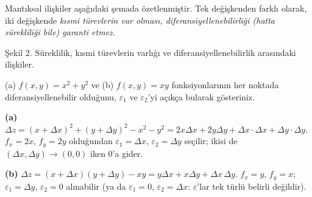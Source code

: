 Mantıksal ilişkiler aşağıdaki şemada özetlenmiştir. Tek değişkenden farklı olarak, iki değişkende \emph{kısmi türevlerin
var olması, diferansiyellenebilirliği (hatta sürekliliği bile) garanti etmez.}

\begin{center}
\end{center}
\begin{center}
{\small Şekil 2. Süreklilik, kısmi türevlerin varlığı ve diferansiyellenebilirlik arasındaki ilişkiler.}
\end{center}

\begin{soru}
(a) $f(x,y)=x^2+y^2$ ve (b) $f(x,y)=xy$ fonksiyonlarının her noktada diferansiyellenebilir olduğunu, $\varepsilon_1$
ve $\varepsilon_2$'yi açıkça bularak gösteriniz.
\end{soru}
\begin{cevap}
\textbf{(a)} $\Delta z=(x+\Delta x)^2+(y+\Delta y)^2-x^2-y^2=2x\Delta x+2y\Delta y+\Delta x\cdot\Delta x+\Delta y\cdot\Delta y$.
$f_x=2x$, $f_y=2y$ olduğundan $\varepsilon_1=\Delta x$, $\varepsilon_2=\Delta y$ seçilir; ikisi de
$(\Delta x,\Delta y)\to(0,0)$ iken $0$'a gider.

\textbf{(b)} $\Delta z=(x+\Delta x)(y+\Delta y)-xy=y\Delta x+x\Delta y+\Delta x\,\Delta y$. $f_x=y$, $f_y=x$;
$\varepsilon_1=\Delta y$, $\varepsilon_2=0$ alınabilir (ya da $\varepsilon_1=0$, $\varepsilon_2=\Delta x$:
$\varepsilon$'lar tek türlü belirli değildir).
\end{cevap}

